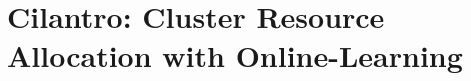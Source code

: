 \chapter{Cilantro: Cluster Resource Allocation with Online-Learning}
\label{ch_cilantro}


\newcommand{\cilantropolicyheader}[1]{\underline{#1}}



















%
